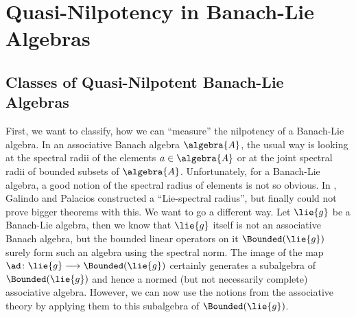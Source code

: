 \documentclass[
11pt,                          %
english                        %
]{article}
\begin{document}
\section{Quasi-Nilpotency in Banach-Lie Algebras}
\label{sec:QuasiNilpotency}

\subsection{Classes of Quasi-Nilpotent Banach-Lie Algebras}
First, we want to classify, how we can ``measure'' the nilpotency of a Banach-Lie 
algebra. In an associative Banach algebra $\algebra{A}$, the usual way is looking 
at the spectral radii of the elements $a \in \algebra{A}$ or at the joint spectral 
radii of bounded subsets of $\algebra{A}$. Unfortunately, for a Banach-Lie algebra, 
a good notion of the spectral radius of elements is not so obvious. In 
\cite{galindo.palacios:2012a}, Galindo and Palacios constructed a ``Lie-spectral 
radius'', but finally could not prove bigger theorems with this. We want to go a 
different way. Let $\lie{g}$ be a Banach-Lie algebra, then we know that $\lie{g}$ 
itself is not an associative Banach algebra, but the bounded linear operators on it 
$\Bounded(\lie{g})$ surely form such an algebra using the spectral norm. The image 
of the map $\ad \colon \lie{g} \longrightarrow \Bounded(\lie{g})$ certainly 
generates a subalgebra of $\Bounded(\lie{g})$ and hence a normed (but not 
necessarily complete) associative algebra. However, we can now use the notions from 
the associative theory by applying them to this subalgebra of $\Bounded(\lie{g})$.
\end{document}
